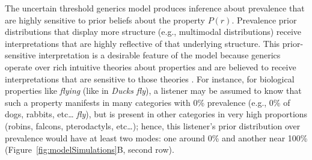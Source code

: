 \documentclass[floatsintext,doc]{apa6}
\let\rmarkdownfootnote\footnote%
\def\footnote{\protect\rmarkdownfootnote}
\begin{document}



 
 The uncertain threshold generics model produces inference about prevalence that are highly sensitive to prior beliefs about the property $P(r)$. 
 Prevalence prior distributions that display more structure (e.g., multimodal distributions) receive interpretations that are highly reflective of that underlying structure.
 This prior-sensitive interpretation is a desirable feature of the model because generics operate over rich intuitive theories about properties and are believed to receive interpretations that are sensitive to those theories \cite{Leslie2007, Gelman2010:essentialist, Cimpian2010theory, Rhodes2012, Prasada2013}. 
 For instance, for biological properties like \emph{flying} (like in \emph{Ducks fly}), a listener may be assumed to know that such a property manifests in many categories with 0\% prevalence (e.g., 0\% of dogs, rabbits, etc\ldots{} \emph{fly}), but is present in other categories in very high proportions (robins, falcons, pterodactyls, etc\ldots{}); hence, this listener's prior distribution over prevalence would have at least two modes: one around 0\% and another near 100\% (Figure~\ref{fig:modelSimulations}B, second row).
\end{document}
